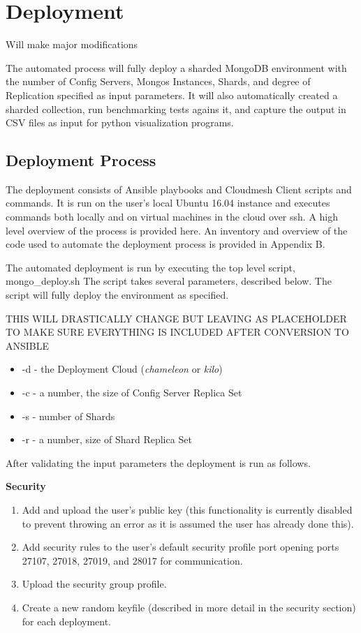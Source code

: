 \documentclass[9pt,twocolumn,twoside]{../../styles/osajnl}
\begin{document}
\section{Deployment}

Will make major modifications

The automated process will fully deploy a sharded MongoDB environment with the number of Config Servers, Mongos Instances, Shards, and degree of Replication specified as input parameters.  It will also automatically created a sharded collection, run benchmarking tests agains it, and capture the output in CSV files as input for python visualization programs.

\subsection{Deployment Process}

The deployment consists of Ansible playbooks and Cloudmesh Client scripts and commands.  It is run on the user's local Ubuntu 16.04 instance and executes commands both locally and on virtual machines in the cloud over ssh.  A high level overview of the process is provided here.  An inventory and overview of the code used to automate the deployment process is provided in Appendix B.

The automated deployment is run by executing the top level script, mongo\_deploy.sh \cite{www-mongoDeploy} \cite{www-shardLocal} The script takes several parameters, described below.  The script will fully deploy the environment as specified.

THIS WILL DRASTICALLY CHANGE BUT LEAVING AS PLACEHOLDER TO MAKE SURE EVERYTHING IS INCLUDED AFTER CONVERSION TO ANSIBLE

\begin{itemize}
\item -d - the Deployment Cloud (\emph{chameleon} or \emph{kilo})
\item -c - a number, the size of Config Server Replica Set
\item -s - number of Shards
\item -r - a number, size of Shard Replica Set
\end{itemize}

After validating the input parameters the deployment is run as follows.

\textbf{Security}
\begin{enumerate}
\item Add and upload the user's public key (this functionality is currently disabled to prevent throwing an error as it is assumed the user has already done this).
\item Add security rules to the user's default security profile port opening ports 27107, 27018, 27019, and 28017 for communication.
\item Upload the security group profile.
\item Create a new random keyfile (described in more detail in the security section) for each deployment.
\end{enumerate}
\end{document}
